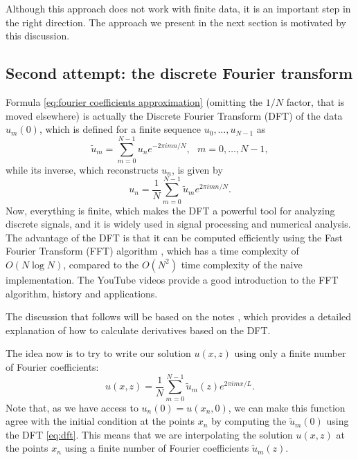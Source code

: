 \documentclass[a4paper,10pt]{report}
\begin{document}
Although this approach does not work with finite data, it is an important step in the right direction. The approach we present in the next section is motivated by this discussion.

\subsection{Second attempt: the discrete Fourier transform}

Formula \eqref{eq:fourier coefficients approximation} (omitting the $1/N$ factor, that is moved elsewhere) is actually the Discrete Fourier Transform (DFT) of the data $u_m(0)$, which is defined for a finite sequence $u_0, \ldots, u_{N-1}$ as
\begin{equation}
    \label{eq:dft}
    \tilde{u}_m = \sum_{m=0}^{N-1} u_n e^{-2\pi i mn/N}, \ \ \ m = 0, \ldots, N-1,
\end{equation}
while its inverse, which reconstructs $u_n$, is given by
\begin{equation}
    u_n = \frac{1}{N} \sum_{m=0}^{N-1} \tilde{u}_m e^{2\pi i mn/N}.
\end{equation}
Now, everything is finite, which makes the DFT a powerful tool for analyzing discrete signals, and it is widely used in signal processing and numerical analysis. The advantage of the DFT is that it can be computed efficiently using the Fast Fourier Transform (FFT) algorithm \cite{cooley1965algorithm}, which has a time complexity of $O(N \log N)$, compared to the $O(N^2)$ time complexity of the naive implementation. The YouTube videos \cite{fft_veritasium, fft_reducible} provide a good introduction to the FFT algorithm, history and applications.

The discussion that follows will be based on the notes \cite{fftderiv}, which provides a detailed explanation of how to calculate derivatives based on the DFT.

The idea now is to try to write our solution $u(x,z)$ using only a finite number of Fourier coefficients:
\begin{equation}
\label{eq:interpolation}
    u(x,z) = \frac{1}{N}\sum_{m=0}^{N-1} \tilde{u}_m(z) e^{2\pi i m x/L}.
\end{equation}
Note that, as we have access to $u_n(0) = u(x_n, 0)$, we can make this function agree with the initial condition at the points $x_n$ by computing the $\tilde{u}_m(0)$ using the DFT \eqref{eq:dft}. This means that we are interpolating the solution $u(x,z)$ at the points $x_n$ using a finite number of Fourier coefficients $\tilde{u}_m(z)$.
\end{document}
